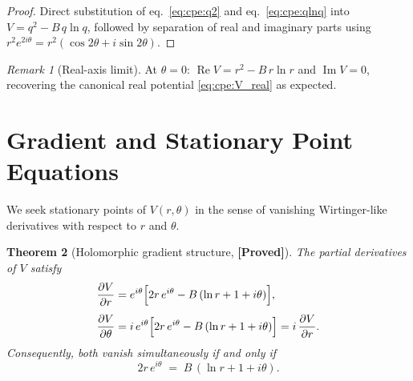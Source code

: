 \documentclass[12pt,a4paper]{article}
\newtheorem{theorem}{Theorem}[section]
\theoremstyle{definition}
\theoremstyle{remark}
\newtheorem{remark}[theorem]{Remark}
\newcommand{\Re}{\operatorname{Re}}
\newcommand{\Im}{\operatorname{Im}}
\newcommand{\PROVED}{\textbf{[Proved]}}
\begin{document}
\begin{proof}
Direct substitution of eq.~\eqref{eq:cpe:q2} and eq.~\eqref{eq:cpe:qlnq}
into $V = q^2 - B\,q\ln q$, followed by separation of real and imaginary parts
using $r^2 e^{2i\theta} = r^2(\cos 2\theta + i\sin 2\theta)$.
\end{proof}

\begin{remark}[Real-axis limit]
At $\theta = 0$: $\Re V = r^2 - B\,r\ln r$ and $\Im V = 0$, recovering
the canonical real potential \eqref{eq:cpe:V_real} as expected.
\end{remark}

\section{Gradient and Stationary Point Equations}
\label{sec:cpe:stationary}

We seek stationary points of $V(r,\theta)$ in the sense of vanishing
Wirtinger-like derivatives with respect to $r$ and $\theta$.

\begin{theorem}[Holomorphic gradient structure, \PROVED]
\label{thm:cpe:grad}
The partial derivatives of $V$ satisfy
\begin{align}
  \frac{\partial V}{\partial r}
  &= e^{i\theta}\Bigl[2r\,e^{i\theta} - B\,(\ln r + 1 + i\theta)\Bigr],
  \label{eq:cpe:dVdr} \\[4pt]
  \frac{\partial V}{\partial \theta}
  &= i\,e^{i\theta}\Bigl[2r\,e^{i\theta} - B\,(\ln r + 1 + i\theta)\Bigr]
  = i\,\frac{\partial V}{\partial r}.
  \label{eq:cpe:dVdtheta}
\end{align}
Consequently, both vanish simultaneously if and only if
\begin{equation}
  2r\,e^{i\theta} \;=\; B\,(\ln r + 1 + i\theta).
  \label{eq:cpe:stationary_complex}
\end{equation}
\end{theorem}
\end{document}

